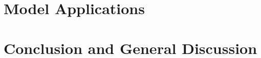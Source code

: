\documentclass[final,faculty=firw,department=wtk,phddegree=wtk]{adsphd}
\begin{document}
\part{Model Applications}

\part{Conclusion and General Discussion}


\backmatter



\instructionsbibliography


\appendix




\makebackcoverXII
\end{document}
